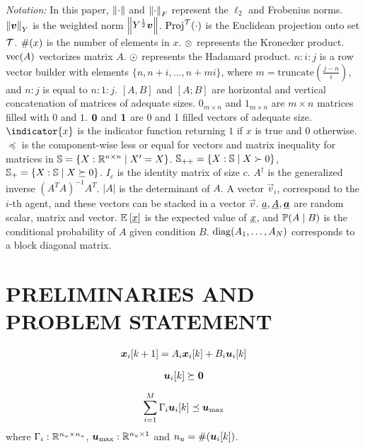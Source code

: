 \documentclass{ifacconf}  %
\begin{document}
\emph{Notation:} In this paper, $\left\lVert\cdot\right\rVert$ and $\left\lVert\cdot\right\rVert_{F}$ represent the $\ell_{2}$ and Frobenius norms. $\left\lVert\boldsymbol{v}\right\rVert_{Y}$ is the weighted norm $\left\lVert Y^{\frac{1}{2}}\boldsymbol{v}\right\rVert$.
$\operatorname{Proj}^{\mathcal{T}}(\cdot)$ is the Euclidean projection onto set $\mathcal{T}$.
$\#(x)$ is the number of elements in $x$.
$\otimes$ represents the Kronecker product.
$\mathrm{vec} (A)$ vectorizes matrix $A$.
$\odot$ represents the Hadamard product.
$n\mathbin{:}i\mathbin{:}j$ is a row vector builder with elements $\{n,n+i,\dots,n+mi\}$, where $m=\mathrm{truncate}(\frac{j-n}{i})$, and ${n\mathbin{:}j}$ is equal to ${n\mathbin{:}1\mathbin{:}j}$.
$[A,B]$ and $[A;B]$ are horizontal and vertical concatenation of matrices of adequate sizes.
$0_{m\times n}$ and $1_{m\times n}$ are ${m\times n}$ matrices filled with $0$ and $1$.
$\mathbf{0}$ and $\mathbf{1}$ are 0 and 1 filled vectors of adequate size.
$\indicator{x}$ is the indicator function returning $1$ if $x$ is true and $0$ otherwise.
$\preceq$ is the component-wise less or equal for vectors and matrix inequality for matrices in ${\mathbb{S}=\{X:\mathbb{R}^{n\times n}\mid X'=X\}}$.
${\mathbb{S}_{++}=\{X:\mathbb{S}\mid X\succ 0\}}$, ${\mathbb{S}_{+}=\{X:\mathbb{S}\mid X\succeq 0\}}$.
$I_{c}$ is the identity matrix of size $c$.
$A^{\dagger}$ is the generalized inverse ${{(A^{T}A)}^{-1}A^{T}}$.
$|A|$ is the determinant of $A$.
A vector $\vec{v}_{i}$, correspond to the $i$-th agent, and these vectors can be stacked in a vector $\vec{v}$.
$\underline{a},\underline{A},{\underline{\boldsymbol{a}}}$ are random scalar, matrix and vector.
$\mathbb{E}_{}\left[\underline{x}\right]$ is the expected value of $\underline{x}$, and $\mathbb{P}(A \mid B)$ is the conditional probability of $A$ given condition $B$.
${\operatorname{diag}(A_{1},\dots,A_{N})}$ corresponds to a block diagonal matrix.

\section{PRELIMINARIES AND PROBLEM STATEMENT}\label{sec:PS}
\begin{equation}
\begin{matrix}
  \label{eq:systems}
\vec{x}_{i}[k+1]=A_{i}\xik + B_{i}\uik
\end{matrix}
\end{equation}

\begin{equation}
  \label{eq:upositive}
  \uik\succeq\0
\end{equation}

\begin{equation}
  \label{eq:constraint}
  \sum^{\nsubsystems}_{i=1}\Gamma_{i}\uik\preceq\umax
\end{equation}
where ${\Gamma_{i}:\mathbb{R}^{n_{u}\times n_{u}}}$, ${\boldsymbol{u}_{\mathrm{\max}}:\mathbb{R}^{n_{u}\times 1}}$ and ${n_{u}=\card{\uik}}$.
\end{document}

